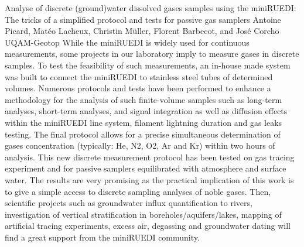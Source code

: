 \begin{conf-abstract}
{Analyse of discrete (ground)water dissolved gases samples using the miniRUEDI: The tricks of a simplified protocol and tests for passive gas samplers}
{Antoine Picard, Matéo Lacheux, Christin Müller, Florent Barbecot, and José Corcho}
{UQAM-Geotop}
{While the miniRUEDI is widely used for continuous measurements, some projects in our laboratory imply to measure gases in discrete samples. To test the feasibility of such measurements, an in-house made system was built to connect the miniRUEDI to stainless steel tubes of determined volumes. Numerous protocols and tests have been performed to enhance a methodology for the analysis of such finite-volume samples such as long-term analyses, short-term analyses, and signal integration as well as diffusion effects within the miniRUEDI line system, filament lightning duration and gas leaks testing. The final protocol allows for a precise simultaneous determination of gases concentration (typically: He, N2, O2, Ar and Kr) within two hours of analysis. This new discrete measurement protocol has been tested on gas tracing experiment and for passive samplers equilibrated with atmosphere and surface water. The results are very promising as the practical implication of this work is to give a simple access to discrete sampling analyses of noble gases. Then, scientific projects such as groundwater influx quantification to rivers, investigation of vertical stratification in boreholes/aquifers/lakes, mapping of artificial tracing experiments, excess air, degassing and groundwater dating will find a great support from the miniRUEDI community.}
\end{conf-abstract}

